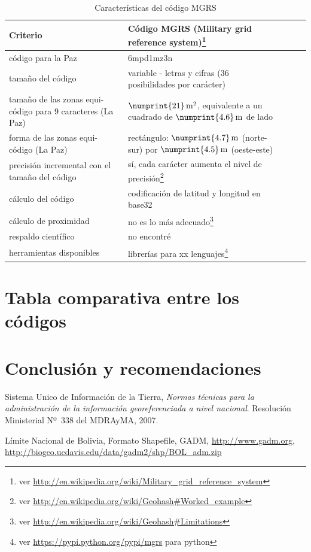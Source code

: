 \documentclass[letterpaper]{article}
\begin{document}
\begin{table}
	\centering
	\begin{tabular}{|l|l|l|l|l|}
		\hline
		Criterio & Código MGRS (Military grid reference system)\footnote{ver 
		\url{http://en.wikipedia.org/wiki/Military_grid_reference_system}} \\
		\hline
		código para la Paz & 6mpd1mz3n \\
		tamaño del código & variable - letras y cifras (36 
		posibilidades por carácter) \\
		tamaño de las zonas equi-código para 9 caracteres (La Paz) & 
		\(\numprint{21}\,\mathrm{m^{2}}\), 
		equivalente a un cuadrado de \(\numprint{4.6}\,\mathrm{m}\) de lado \\
		forma de las zonas equi-código (La Paz) & rectángulo: 
		\(\numprint{4.7}\,\mathrm{m}\) (norte-sur) por 
		\(\numprint{4.5}\,\mathrm{m}\) (oeste-este) \\
		precisión incremental con el tamaño del código & sí, cada 
		carácter aumenta el nivel de precisión\footnote{ver 
		\url{http://en.wikipedia.org/wiki/Geohash\#Worked_example}} \\
		cálculo del código & codificación de latitud y longitud en 
		base32 \\
		cálculo de proximidad & no es lo más adecuado\footnote{ver 
		\url{http://en.wikipedia.org/wiki/Geohash\#Limitations}} \\
		respaldo científico & no encontré \\
		herramientas disponibles & librerías para xx lenguajes\footnote{ver 
		\url{https://pypi.python.org/pypi/mgrs} para python} \\
		\hline
	\end{tabular}
	\caption{Características del código MGRS}
	\label{tab:carac_geohash}
\end{table}


\section{Tabla comparativa entre los códigos}



\section{Conclusión y recomendaciones}

\begin{thebibliography}{99}

  Sistema Unico de Información de la Tierra,
  \emph{Normas técnicas para la administración de la información georeferenciada a nivel nacional}.
  Resolución Ministerial Nº~338 del MDRAyMA,
  2007.

  Límite Nacional de Bolivia,
  Formato Shapefile,
  GADM,
  \url{http://www.gadm.org},
  \url{http://biogeo.ucdavis.edu/data/gadm2/shp/BOL_adm.zip}

\end{thebibliography}
\end{document}
